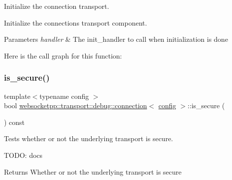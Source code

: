 Initialize the connection transport. 

Initialize the connection\textquotesingle{}s transport component.


\begin{DoxyParams}{Parameters}
{\em handler} & The {\ttfamily init\+\_\+handler} to call when initialization is done \\
\hline
\end{DoxyParams}
Here is the call graph for this function\+:
\mbox{\label{classwebsocketpp_1_1transport_1_1debug_1_1connection_a49c3bba737ddb4a2ef6bf0c3b40fd130}} 
\subsubsection{\texorpdfstring{is\+\_\+secure()}{is\_secure()}}
{\footnotesize\ttfamily template$<$typename config $>$ \\
bool \mbox{\hyperlink{classwebsocketpp_1_1transport_1_1debug_1_1connection}{websocketpp\+::transport\+::debug\+::connection}}$<$ \mbox{\hyperlink{classconfig}{config}} $>$\+::is\+\_\+secure (\begin{DoxyParamCaption}{ }\end{DoxyParamCaption}) const\hspace{0.3cm}{\ttfamily [inline]}}



Tests whether or not the underlying transport is secure. 

T\+O\+DO\+: docs

\begin{DoxyReturn}{Returns}
Whether or not the underlying transport is secure 
\end{DoxyReturn}
\mbox{\label{classwebsocketpp_1_1transport_1_1debug_1_1connection_a36a7e0c517495dd8bdbecfa75c5a9d7b}} 
